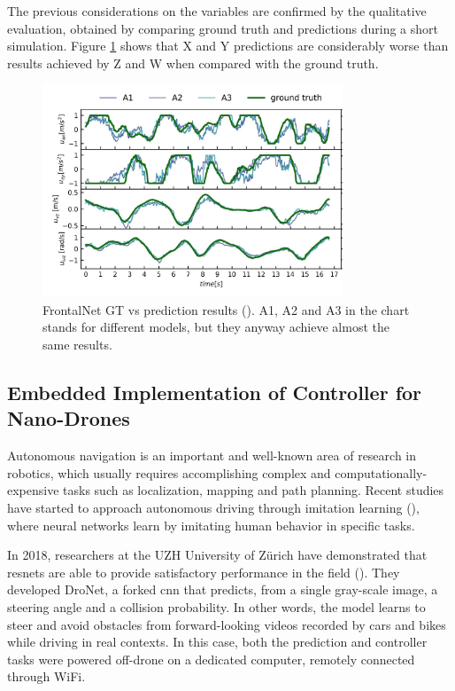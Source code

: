 \medskip

The previous considerations on the variables are confirmed by the qualitative evaluation, obtained by comparing ground truth and predictions during a short simulation. Figure \ref{fig:frontalnet-gt-pred} shows that X and Y predictions are considerably worse than results achieved by Z and W when compared with the ground truth.

\begin{figure}[!htb]
	\centering
	\includegraphics[width=0.8\textwidth]{"contents/images/03-frontalnet-gt-pred-2"}
	\caption[FrontalNet GT vs prediction results (\cite{mantegazza2019visionbased})]{FrontalNet GT vs prediction results (\cite{mantegazza2019visionbased}). A1, A2 and A3 in the chart stands for different models, but they anyway achieve almost the same results.}
	\label{fig:frontalnet-gt-pred}
\end{figure}


\subsection{Embedded Implementation of Controller for Nano-Drones}
\label{subsec:sota-nicky}

Autonomous navigation is an important and well-known area of research in robotics, which usually requires accomplishing complex and computationally-expensive tasks such as localization, mapping and path planning. Recent studies have started to approach autonomous driving through imitation learning (\cite{imitation_learning_survey}), where neural networks learn by imitating human behavior in specific tasks. 

\medskip

In 2018, researchers at the UZH University of Zürich have demonstrated that \gls{resnet}s are able to provide satisfactory performance in the field (\cite{Loquercio_2018}). They developed DroNet, a forked \gls{cnn} that predicts, from a single gray-scale image, a steering angle and a collision probability. In other words, the model learns to steer and avoid obstacles from forward-looking videos recorded by cars and bikes while driving in real contexts. In this case, both the prediction and controller tasks were powered off-drone on a dedicated computer, remotely connected through WiFi. 

